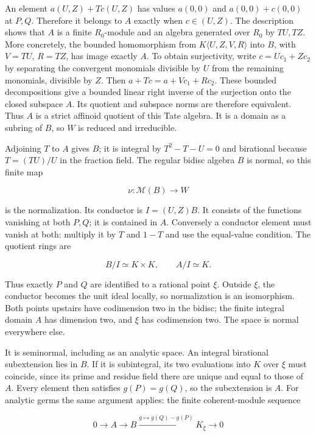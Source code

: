 \documentclass[11pt,a4paper]{article}
\begin{document}
An element \(a(U,Z)+Tc(U,Z)\) has values \(a(0,0)\) and \(a(0,0)+c(0,0)\) at \(P,Q\). Therefore it belongs to \(A\) exactly when \(c\in(U,Z)\). The description shows that \(A\) is a finite \(R_0\)-module and an algebra generated over \(R_0\) by \(TU,TZ\). More concretely, the bounded homomorphism from \(K\langle U,Z,V,R\rangle\) into \(B\), with \(V=TU\), \(R=TZ\), has image exactly \(A\). To obtain surjectivity, write \(c=Uc_1+Zc_2\) by separating the convergent monomials divisible by \(U\) from the remaining monomials, divisible by \(Z\). Then \(a+Tc=a+Vc_1+Rc_2\). These bounded decompositions give a bounded linear right inverse of the surjection onto the closed subspace \(A\). Its quotient and subspace norms are therefore equivalent. Thus \(A\) is a strict affinoid quotient of this Tate algebra. It is a domain as a subring of \(B\), so \(W\) is reduced and irreducible.

Adjoining \(T\) to \(A\) gives \(B\); it is integral by \(T^2-T-U=0\) and birational because \(T=(TU)/U\) in the fraction field. The regular bidisc algebra \(B\) is normal, so this finite map

\[
\nu:\mathcal M(B)\longrightarrow W
\]

is the normalization. Its conductor is \(I=(U,Z)B\). It consists of the functions vanishing at both \(P,Q\); it is contained in \(A\). Conversely a conductor element must vanish at both: multiply it by \(T\) and \(1-T\) and use the equal-value condition. The quotient rings are

\[
B/I\simeq K\times K,\qquad A/I\simeq K.
\]

Thus exactly \(P\) and \(Q\) are identified to a rational point \(\xi\). Outside \(\xi\), the conductor becomes the unit ideal locally, so normalization is an isomorphism. Both points upstairs have codimension two in the bidisc; the finite integral domain \(A\) has dimension two, and \(\xi\) has codimension two. The space is normal everywhere else.

It is seminormal, including as an analytic space. An integral birational subextension lies in \(B\). If it is subintegral, its two evaluations into \(K\) over \(\xi\) must coincide, since its prime and residue field there are unique and equal to those of \(A\). Every element then satisfies \(g(P)=g(Q)\), so the subextension is \(A\). For analytic germs the same argument applies: the finite coherent-module sequence

\[
0\longrightarrow A\longrightarrow B
\overset{g\mapsto g(Q)-g(P)}{\longrightarrow}K_\xi\longrightarrow0
\]
\end{document}
